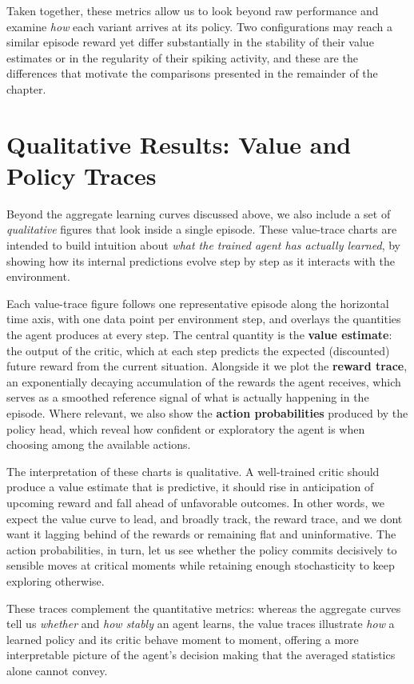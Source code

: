 Taken together, these metrics allow us to look beyond raw performance and examine \emph{how} each 
variant arrives at its policy. Two configurations may reach a similar episode reward yet differ 
substantially in the stability of their value estimates or in the regularity of their spiking 
activity, and these are the differences that motivate the comparisons presented in the 
remainder of the chapter.

\section{Qualitative Results: Value and Policy Traces}
\label{sec:value-traces}

Beyond the aggregate learning curves discussed above, we also include a set of \emph{qualitative} 
figures that look inside a single episode. These 
value-trace charts are intended to build intuition about \emph{what the trained agent has actually 
learned}, by showing how its internal predictions evolve step by step as it interacts with the 
environment.

Each value-trace figure follows one representative episode along the horizontal time axis, with one 
data point per environment step, and overlays the quantities the agent produces at every step. The 
central quantity is the \textbf{value estimate}: the output of the critic, which at each step 
predicts the expected (discounted) future reward from the current situation. Alongside it we plot 
the \textbf{reward trace}, an exponentially decaying accumulation of the rewards the agent receives, 
which serves as a smoothed reference signal of what is actually happening in the episode. Where 
relevant, we also show the \textbf{action probabilities} produced by the policy head, which reveal 
how confident or exploratory the agent is when choosing among the available actions.

The interpretation of these charts is qualitative. A well-trained critic should produce a value 
estimate that is predictive, it should rise in anticipation of 
upcoming reward and fall ahead of unfavorable outcomes. 
In other words, we expect the value curve to lead, and broadly track, the reward 
trace, and we dont want it lagging behind of the rewards or remaining flat and uninformative. 
The action probabilities, in turn, let us see whether the policy commits decisively 
to sensible moves at critical moments 
while retaining enough stochasticity to keep exploring otherwise.

These traces complement the quantitative metrics: whereas the aggregate curves tell us \emph{whether} 
and \emph{how stably} an agent learns, the value traces illustrate \emph{how} a learned policy and 
its critic behave moment to moment, offering a more interpretable picture of the agent's decision 
making that the averaged statistics alone cannot convey.

